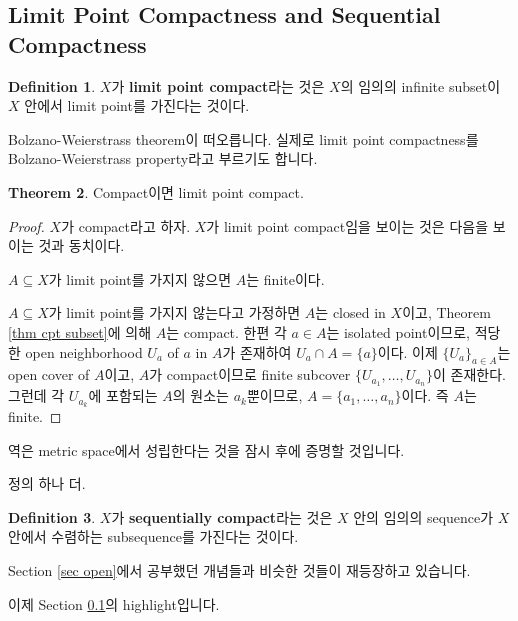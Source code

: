 \documentclass[12pt]{article}
\theoremstyle{definition}
\newtheorem{thm}{Theorem}[section]
\newtheorem{defn}[thm]{Definition}
\begin{document}
\subsection{Limit Point Compactness and Sequential Compactness} \label{sec lpc}


	\begin{defn}
		\(X\)가 \textbf{limit point compact}라는 것은 \(X\)의 임의의 infinite subset이 \(X\) 안에서 limit point를 가진다는 것이다.
	\end{defn}

Bolzano-Weierstrass theorem이 떠오릅니다. 실제로 limit point compactness를 Bolzano-Weierstrass property라고 부르기도 합니다.

	\begin{thm}
		Compact이면 limit point compact.
	\end{thm}
	\begin{proof}
		\(X\)가 compact라고 하자. \(X\)가 limit point compact임을 보이는 것은 다음을 보이는 것과 동치이다.
		\begin{center}
			\(A \subseteq X\)가 limit point를 가지지 않으면 \(A\)는 finite이다.
		\end{center}
		\(A \subseteq X\)가 limit point를 가지지 않는다고 가정하면 \(A\)는 closed in \(X\)이고, Theorem \ref{thm cpt subset}에 의해 \(A\)는 compact. 한편 각 \(a \in A\)는 isolated point이므로, 적당한 open neighborhood \(U_a\) of \(a\) in \(A\)가 존재하여 \(U_a \cap  A= \{a\}\)이다. 이제 \(\{U_a\}_{a \in A}\)는 open cover of \(A\)이고, \(A\)가 compact이므로 finite subcover \(\{U_{a_1}, \ldots, U_{a_n}\}\)이 존재한다. 그런데 각 \(U_{a_k}\)에 포함되는 \(A\)의 원소는 \(a_k\)뿐이므로, \(A = \{a_1, \ldots, a_n\}\)이다. 즉 \(A\)는 finite.
	\end{proof}

역은 metric space에서 성립한다는 것을 잠시 후에 증명할 것입니다.

정의 하나 더.

	\begin{defn}
		\(X\)가 \textbf{sequentially compact}라는 것은 \(X\) 안의 임의의 sequence가 \(X\) 안에서 수렴하는 subsequence를 가진다는 것이다.
	\end{defn}

Section \ref{sec open}에서 공부했던 개념들과 비슷한 것들이 재등장하고 있습니다.

이제 Section \ref{sec lpc}의 highlight입니다.
\end{document}
